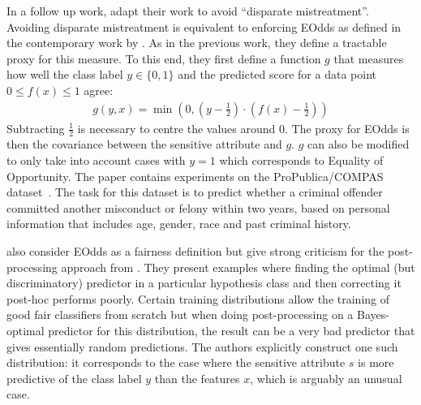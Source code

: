 In a follow up work, \citet{zafar2017fairnesstreatment} adapt their work to avoid ``disparate mistreatment''.
Avoiding disparate mistreatment is equivalent to enforcing \acf{EOdds}
as defined in the contemporary work by \citet{hardt2016equality}.
As in the previous work, they define a tractable proxy for this measure.
To this end, they first define a function \(g\) that measures
how well the class label \(y \in \{0, 1\}\) and the predicted score for a data point \(0 \leq f(x) \leq 1\) agree:
\begin{align}
  \label{eq:zafar-constraint-2}
  g(y, x) = \min \left(0, \left(y - \tfrac{1}{2}\right) \cdot \left(f(x) - \tfrac{1}{2}\right)\right)
\end{align}
Subtracting \(\tfrac{1}{2}\) is necessary to centre the values around \(0\).
The proxy for \ac{EOdds} is then the covariance between the sensitive attribute and \(g\).
\(g\) can also be modified to only take into account cases with \(y=1\) which corresponds to Equality of Opportunity.
The paper contains experiments on the ProPublica/COMPAS dataset~\citep{angwin2016machine}.
The task for this dataset is to predict
whether a criminal offender committed another misconduct or felony within two years,
based on personal information that includes age, gender, race and past criminal history.

\citet{woodworth2017learning} also consider \ac{EOdds} as a fairness definition
but give strong criticism for the post-processing approach from \citet{hardt2016equality}.
They present examples where finding the optimal (but discriminatory) predictor in a particular hypothesis class
and then correcting it post-hoc performs poorly.
Certain training distributions allow the training of good fair classifiers from scratch
but when doing post-processing on a Bayes-optimal predictor for this distribution,
the result can be a very bad predictor that gives essentially random predictions.
The authors explicitly construct one such distribution:
it corresponds to the case where the sensitive attribute \(s\) is more predictive of the class label \(y\)
than the features \(x\), which is arguably an unusual case.


